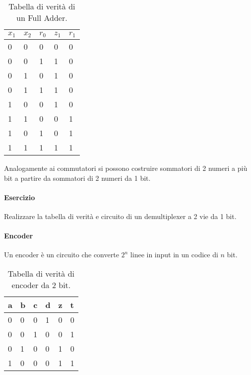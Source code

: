 \begin{table}[H]
	\centering
	\caption{Tabella di verità di un Full Adder.}
	\label{tab:sum1bit}
	\begin{tabular}{|lll|l|l|}
		\hline
		$ x_{1} $ & $ x _{2} $ & $ r_0 $ & $ z_1 $ & $r_1$ \\ \hline
		0         & 0          & 0       & 0       & 0     \\
		0         & 0          & 1       & 1       & 0     \\
		0         & 1          & 0       & 1       & 0     \\
		0         & 1          & 1       & 1       & 0     \\
		1         & 0          & 0       & 1       & 0     \\
		1         & 1          & 0       & 0       & 1     \\
		1         & 0          & 1       & 0       & 1     \\
		1         & 1          & 1       & 1       & 1     \\ \hline
	\end{tabular}
\end{table}


Analogamente ai commutatori si possono costruire sommatori di 2 numeri a più bit a partire da sommatori di 2 numeri da 1 bit.


\paragraph{Esercizio}
Realizzare la tabella di verità e circuito di un demultiplexer a 2 vie da 1 bit.

\paragraph{Encoder}
Un encoder è un circuito che converte $ 2^n $ linee in input in un codice di $ n $ bit. 

\begin{table}[H]
	\centering
	\caption{Tabella di verità di encoder da 2 bit.}
	\label{tab:2bitencoder}
	\begin{tabular}{|llll|ll|}
		\hline
		a & b & c & d & z & t \\ \hline
		0 & 0 & 0 & 1 & 0 & 0 \\
		0 & 0 & 1 & 0 & 0 & 1 \\
		0 & 1 & 0 & 0 & 1 & 0 \\
		1 & 0 & 0 & 0 & 1 & 1 \\ \hline
	\end{tabular}
\end{table}

